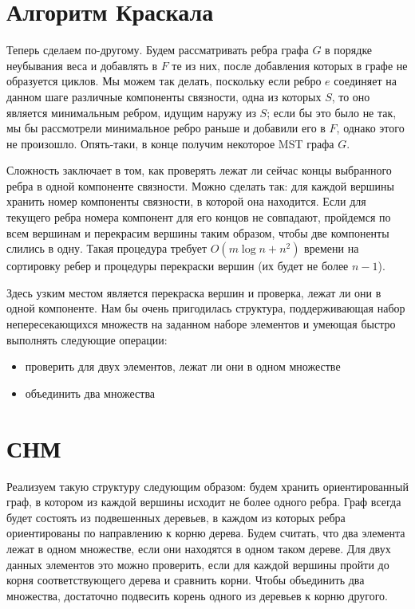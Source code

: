 \documentclass[12pt]{article}
\begin{document}
\section{Алгоритм Краскала}

Теперь сделаем по-другому. Будем рассматривать ребра графа $G$ в порядке неубывания веса и добавлять в $F$ те из них, после добавления которых в графе не образуется циклов. Мы можем так делать, поскольку если ребро $e$ соединяет на данном шаге различные компоненты связности, одна из которых $S$, то оно является минимальным ребром, идущим наружу из $S$; если бы это было не так, мы бы рассмотрели минимальное ребро раньше и добавили его в $F$, однако этого не произошло. Опять-таки, в конце получим некоторое MST графа $G$.

Сложность заключает в том, как проверять лежат ли сейчас концы выбранного ребра в одной компоненте связности. Можно сделать так: для каждой вершины хранить номер компоненты связности, в которой она находится. Если для текущего ребра номера компонент для его концов не совпадают, пройдемся по всем вершинам и перекрасим вершины таким образом, чтобы две компоненты слились в одну. Такая процедура требует $O(m \log n + n^2)$ времени на сортировку ребер и процедуры перекраски вершин (их будет не более $n-1$).

Здесь узким местом является перекраска вершин и проверка, лежат ли они в одной компоненте. Нам бы очень пригодилась структура, поддерживающая набор непересекающихся множеств на заданном наборе элементов и умеющая быстро выполнять следующие операции:

\begin{itemize}

\item проверить для двух элементов, лежат ли они в одном множестве

\item объединить два множества

\end{itemize}

\section{СНМ}

Реализуем такую структуру следующим образом: будем хранить ориентированный граф, в котором из каждой вершины исходит не более одного ребра. Граф всегда будет состоять из подвешенных деревьев, в каждом из которых ребра ориентированы по направлению к корню дерева. Будем считать, что два элемента лежат в одном множестве, если они находятся в одном таком дереве. Для двух данных элементов это можно проверить, если для каждой вершины пройти до корня соответствующего дерева и сравнить корни. Чтобы объединить два множества, достаточно подвесить корень одного из деревьев к корню другого.
\end{document}
